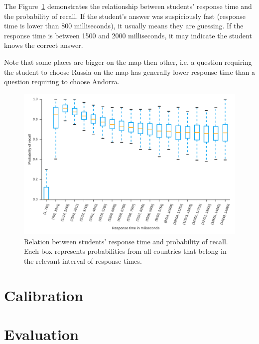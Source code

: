 The Figure~\ref{fig-response-time} demonstrates the relationship between students' response time and the probability of recall. If the student's answer was suspiciously fast (response time is lower than 800 milliseconds), it usually means they are guessing. If the response time is between 1500 and 2000 milliseconds, it may indicate the student knows the correct answer.

Note that some places are bigger on the map then other, i.e. a question requiring the student to choose Russia on the map has generally lower response time than a question requiring to choose Andorra.

\begin{figure}[htbp]
  \centering
  \includegraphics[width=\textwidth]{img/response-time}
  \caption{Relation between students' response time and probability of recall. Each box represents probabilities from all countries that belong in the relevant interval of response times.}
  \label{fig-response-time}
\end{figure}

\section{Calibration}

\section{Evaluation}
